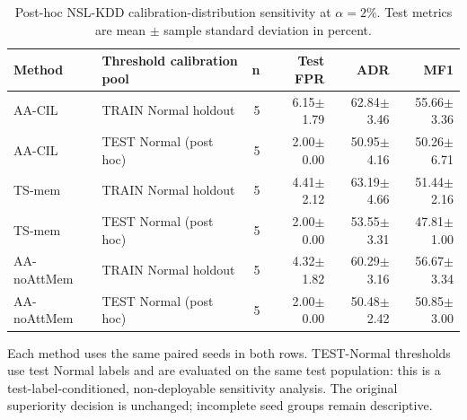 \begin{table}[t]
\centering\scriptsize
\setlength{\tabcolsep}{3.8pt}
\caption{Post-hoc NSL-KDD calibration-distribution sensitivity at $\alpha=2\%$. Test metrics are mean $\pm$ sample standard deviation in percent.}\label{tab:calibration-shift}
\begin{tabular}{llrrrr}
\toprule
Method & Threshold calibration pool & n & Test FPR & ADR & MF1 \\
\midrule
AA-CIL & TRAIN Normal holdout & 5 & 6.15$\pm$1.79 & 62.84$\pm$3.46 & 55.66$\pm$3.36 \\
AA-CIL & TEST Normal (post hoc) & 5 & 2.00$\pm$0.00 & 50.95$\pm$4.16 & 50.26$\pm$6.71 \\
TS-mem & TRAIN Normal holdout & 5 & 4.41$\pm$2.12 & 63.19$\pm$4.66 & 51.44$\pm$2.16 \\
TS-mem & TEST Normal (post hoc) & 5 & 2.00$\pm$0.00 & 53.55$\pm$3.31 & 47.81$\pm$1.00 \\
AA-noAttMem & TRAIN Normal holdout & 5 & 4.32$\pm$1.82 & 60.29$\pm$3.16 & 56.67$\pm$3.34 \\
AA-noAttMem & TEST Normal (post hoc) & 5 & 2.00$\pm$0.00 & 50.48$\pm$2.42 & 50.85$\pm$3.00 \\
\bottomrule
\end{tabular}
\par\vspace{2pt}\begin{minipage}{.98\linewidth}\footnotesize Each method uses the same paired seeds in both rows. TEST-Normal thresholds use test Normal labels and are evaluated on the same test population: this is a test-label-conditioned, non-deployable sensitivity analysis. The original superiority decision is unchanged; incomplete seed groups remain descriptive.\end{minipage}
\end{table}

